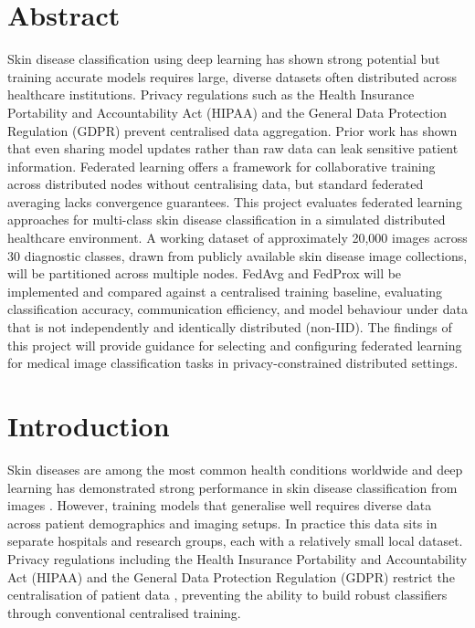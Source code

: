 \documentclass[12pt,openany,a4paper]{book}
\begin{document}
\chapter{Abstract}

Skin disease classification using deep learning has shown strong potential but training accurate models requires large, diverse datasets often distributed across healthcare institutions. Privacy regulations such as the Health Insurance Portability and Accountability Act (HIPAA) and the General Data Protection Regulation (GDPR) prevent centralised data aggregation. Prior work has shown that even sharing model updates rather than raw data can leak sensitive patient information. Federated learning offers a framework for collaborative training across distributed nodes without centralising data, but standard federated averaging lacks convergence guarantees. This project evaluates federated learning approaches for multi-class skin disease classification in a simulated distributed healthcare environment. A working dataset of approximately 20,000 images across 30 diagnostic classes, drawn from publicly available skin disease image collections, will be partitioned across multiple nodes. FedAvg and FedProx will be implemented and compared against a centralised training baseline, evaluating classification accuracy, communication efficiency, and model behaviour under data that is not independently and identically distributed (non-IID). The findings of this project will provide guidance for selecting and configuring federated learning for medical image classification tasks in privacy-constrained distributed settings.

\tableofcontents

\listoffigures
{}

\listoftables
{}

\cleardoublepage

\mainmatter

\chapter{Introduction}
  Skin diseases are among the most common health conditions worldwide \cite{hayGlobalBurdenSkin2014} and deep learning has demonstrated strong performance in skin disease classification from images \cite{estevaDermatologistlevelClassificationSkin2017}. However, training models that generalise well requires diverse data across patient demographics and imaging setups. In practice this data sits in separate hospitals and research groups, each with a relatively small local dataset. Privacy regulations including the Health Insurance Portability and Accountability Act (HIPAA) and the General Data Protection Regulation (GDPR) restrict the centralisation of patient data \cite{kaissisSecurePrivacypreservingFederated2020}, preventing the ability to build robust classifiers through conventional centralised training.
\end{document}
